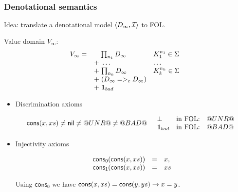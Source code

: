 \documentclass[serif,professionalfont]{beamer}
\begin{document}
\begin{frame}[fragile]
  \frametitle{Denotational semantics}

  Idea: translate a denotational model $\langle D_\infty,{\cal I}\rangle$ to FOL.

  Value domain $V_{\infty}$:
    \[V_{\infty} = \begin{array}[t]{ll}
             \quad\;{\prod_{n_1}{D_{\infty}}} & K_1^{n_1} \in \Sigma \\
             \; + \;\ldots                    & \ldots \\
             \; + \;{\prod_{n_k}{D_{\infty}}} & K_k^{n_k} \in \Sigma \\
             \; + \;(D_{\infty} =>_c D_{\infty}) \\
             \; + \;{\sf{\bf 1}}_{bad} \quad
    \end{array}\]

  \begin{itemize}
    \item Discrimination axioms

    \[\begin{array}{cc}

      \mathsf{cons}(x,xs) \neq \mathsf{nil} \neq @UNR@ \neq @BAD@

      &

      \begin{array}{lll }
      \bot          & \text{in FOL:} & @UNR@\\
      {\sf{\bf 1}}_{bad} & \text{in FOL:} & @BAD@
      \end{array}
    \end{array}\]

    \item Injectivity axioms

    \[\begin{array}{lcl}
      \mathsf{cons_0}(\mathsf{cons}(x,xs)) & = & x, \\
      \mathsf{cons_1}(\mathsf{cons}(x,xs)) & = & xs
    \end{array}\]

    Using $\mathsf{cons_0}$ we have $\mathsf{cons}(x,xs) = \mathsf{cons}(y,ys) \to x = y$.
  \end{itemize}

\end{frame}
\end{document}
